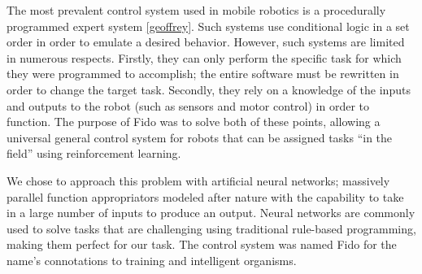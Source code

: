The most prevalent control system used in mobile robotics is a procedurally programmed expert system \ref{geoffrey}.  Such systems use conditional logic in a set order in order to emulate a desired behavior.  However, such systems are limited in numerous respects.  Firstly, they can only perform the specific task for which they were programmed to accomplish; the entire software must be rewritten in order to change the target task.  Secondly, they rely on a knowledge of the inputs and outputs to the robot (such as sensors and motor control) in order to function.  The purpose of Fido was to solve both of these points, allowing a universal general control system for robots that can be assigned tasks ``in the field'' using reinforcement learning.  

We chose to approach this problem with artificial neural networks; massively parallel function appropriators modeled after nature with the capability to take in a large number of inputs to produce an output.  Neural networks are commonly used to solve tasks that are challenging using traditional rule-based programming, making them perfect for our task.  The control system was named Fido for the name's connotations to training and intelligent organisms. 